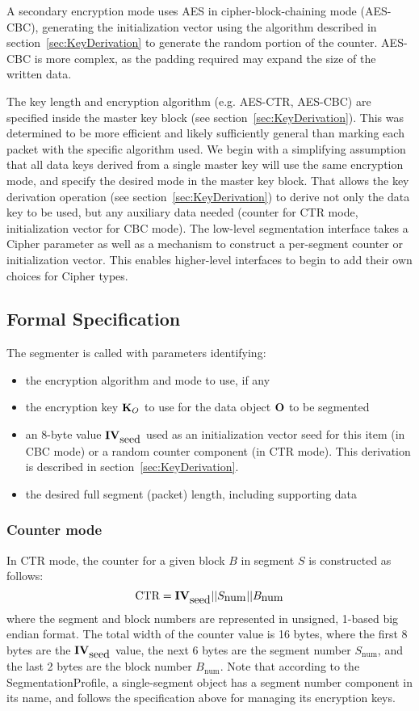 A secondary encryption mode uses AES in cipher-block-chaining mode
(AES-CBC), generating the initialization vector using the algorithm
described in section~\ref{sec:KeyDerivation} to generate the random
portion of the counter. AES-CBC is more complex, as the padding
required may expand the size of the written data.

The key length and encryption algorithm (e.g. AES-CTR, AES-CBC) are
specified inside the master key block (see
section~\ref{sec:KeyDerivation}). This was determined to be more
efficient and likely sufficiently general than marking each packet
with the specific algorithm used. We begin with a simplifying
assumption that all data keys derived from a single master key will
use the same encryption mode, and specify the desired mode in the
master key block. That allows the key derivation operation (see
section~\ref{sec:KeyDerivation}) to derive not only the data key to be
used, but any auxiliary data needed (counter for CTR mode,
initialization vector for CBC mode). The low-level segmentation
interface takes a Cipher parameter as well as a mechanism to construct
a per-segment counter or initialization vector. This enables
higher-level interfaces to begin to add their own choices for Cipher
types.


\subsection{Formal Specification}

The segmenter is called with parameters identifying:
\begin{itemize}
\item the encryption algorithm and mode to use, if any
\item the encryption key ${\textbf{K}_O}$ to use for the data object ${\textbf{O}}$ to be segmented
\item an 8-byte value ${\textbf{IV}}_{\mbox{seed}}$ used as an initialization
  vector seed for this item (in CBC mode) or a random counter
  component (in CTR mode). This derivation is described in
  section~\ref{sec:KeyDerivation}.
\item the desired full segment (packet) length, including supporting data 
\end{itemize}

\subsubsection{Counter mode}

In CTR mode, the counter for a given block $B$ in segment $S$ is
constructed as follows:
$$\mbox{CTR} = {\textbf{IV}}_{\mbox{seed}} || S_{\mbox{num}} || B_{\mbox{num}}$$
where the segment and block numbers are represented in unsigned,
1-based big endian format. The total width of the counter value is 16
bytes, where the first 8 bytes are the ${\textbf{IV}}_{\mbox{seed}}$ value, the
next 6 bytes are the segment number $S_{\mbox{num}}$, and the last 2
bytes are the block number $B_{\mbox{num}}$. Note that according to
the SegmentationProfile, a single-segment object has a segment number
component in its name, and follows the specification above for
managing its encryption keys.

